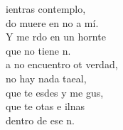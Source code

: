 \begin{cancion}
	ientras  contemplo, \\
	do muere en no a mí.\\
	Y me rdo en un hornte \\
	que no tiene n. \\
	\jump
	a no encuentro ot verdad,\\
	 no hay nada taeal,\\
	que te esdes y me gus,\\
	que te otas e ilnas\\
	dentro de ese n.\\
	\jump
\end{cancion}%
